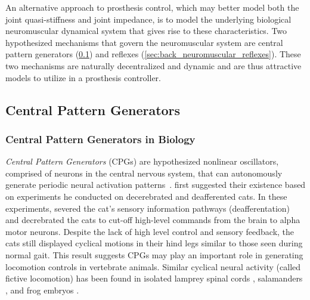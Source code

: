 An alternative approach to prosthesis control, which may better model both the
joint quasi-stiffness and joint impedance, is to model the underlying biological
neuromuscular dynamical system that gives rise to these characteristics. Two
hypothesized mechanisms that govern the neuromuscular system are central pattern
generators (\cref{sec:back_CPG}) and reflexes
(\cref{sec:back_neuromuscular_reflexes}). These two mechanisms are naturally
decentralized and dynamic and are thus attractive models to utilize in a
prosthesis controller.

\subsection{Central Pattern Generators}\label{sec:back_CPG}
\subsubsection{Central Pattern Generators in Biology}
\emph{Central Pattern Generators} (CPGs) are hypothesized nonlinear
oscillators, comprised of neurons in the central nervous system, that can
autonomously generate periodic neural activation
patterns~\citep{ijspeert2008central}.  \citet{brown1911intrinsic} first
suggested their existence based on experiments he conducted on decerebrated and
deafferented cats. In these experiments, \citeauthor{brown1911intrinsic} severed
the cat's sensory information pathways (deafferentation) and decrebrated the
cats to cut-off high-level commands from the brain to alpha motor neurons.
Despite the lack of high level control and sensory feedback, the cats still
displayed cyclical motions in their hind legs similar to those seen during
normal gait. This result suggests CPGs may play an important role in generating
locomotion controls in vertebrate animals. Similar cyclical neural activity
(called fictive locomotion) has been found in isolated lamprey spinal cords
\citep{cohen1980neuronal}, salamanders \citep{delvolve1999fictive}, and frog
embryos \citep{soffe1982tonic}. 

